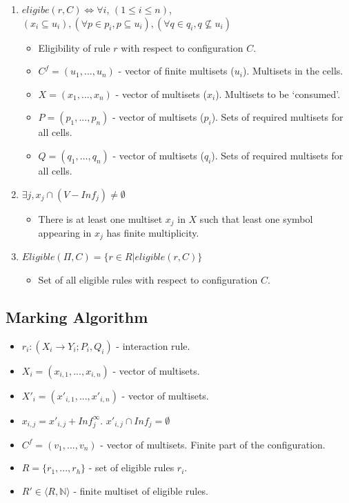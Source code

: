 \documentclass{article}
\begin{document}
\begin{appendices}
\begin{enumerate}
   \item $eligibe(r,C) \Leftrightarrow \forall i$, $(1 \leq i \leq n)$, $(x_i \subseteq u_i ),(\forall p \in p_i, p \subseteq u_i), (\forall q \in q_i, q \not\subseteq u_i)$
         \begin{itemize}
         \item Eligibility of rule $r$ with respect to configuration $C$.
         \item $C^f = (u_1,...,u_n)$ - vector of finite multisets ($u_i$). Multisets in the cells.
         \item $X = (x_1,...,x_n)$ - vector of multisets ($x_i$). Multisets to be `consumed'.
         \item $P = (p_1,...,p_n)$ - vector of multisets ($p_i$). Sets of required multisets for all cells.
         \item $Q = (q_1,...,q_n)$ - vector of multisets ($q_i$). Sets of required multisets for all cells.
         \end{itemize}
   \item $\exists j, x_j \cap (V - Inf_j) \neq \emptyset$
         \begin{itemize}
         \item There is at least one multiset $x_j$ in $X$  such that least one symbol appearing in $x_j$ has finite multiplicity.
         \end{itemize}
   \item $Eligible(\Pi, C) = \{r \in R | eligible(r,C)\}$
         \begin{itemize}
         \item Set of all eligible rules with respect to configuration $C$.
         \end{itemize}
\end{enumerate}


\subsection{Marking Algorithm} 

\begin{itemize}
   \item $r_i: (X_i \rightarrow Y_i; P_i, Q_i)$ - interaction rule.
   \item $X_i = (x_{i,1},...,x_{i,n})$ - vector of multisets.
   \item $X'_i = (x'_{i,1},...,x'_{i,n})$ - vector of multisets.
   \item $x_{i,j} = x'_{i,j} + Inf_{j}^{\infty}$. $x'_{i,j} \cap Inf_j = \emptyset$
   \item $C^f = (v_1,...,v_n)$ - vector of multisets. Finite part of the configuration.
   \item $R = \{r_1,...,r_h\}$ - set of eligible rules $r_i$.
   \item $R' \in \langle R, \mathbb{N} \rangle$ - finite multiset of eligible rules.
\end{itemize}


\end{appendices}
\end{document}
